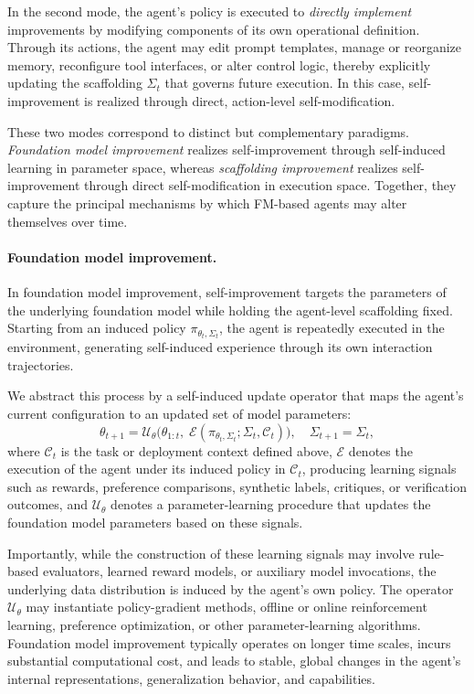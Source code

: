 In the second mode, the agent’s policy is executed to \emph{directly implement} improvements by modifying components of its own operational definition. Through its actions, the agent may edit prompt templates, manage or reorganize memory, reconfigure tool interfaces, or alter control logic, thereby explicitly updating the scaffolding $\Sigma_t$ that governs future execution. In this case, self-improvement is realized through direct, action-level self-modification.

These two modes correspond to distinct but complementary paradigms. \emph{Foundation model improvement} realizes self-improvement through self-induced learning in parameter space, whereas \emph{scaffolding improvement} realizes self-improvement through direct self-modification in execution space. Together, they capture the principal mechanisms by which FM-based agents may alter themselves over time.

\paragraph{Foundation model improvement.}
In foundation model improvement, self-improvement targets the parameters of the underlying foundation model while holding the agent-level scaffolding fixed. Starting from an induced policy $\pi_{\theta_t, \Sigma_t}$, the agent is repeatedly executed in the environment, generating self-induced experience through its own interaction trajectories.

We abstract this process by a self-induced update operator that maps the agent’s current configuration to an updated set of model parameters:
\begin{equation}
\theta_{t+1} = \mathcal{U}_\theta\bigl(\theta_{1:t},\; \mathcal{E}(\pi_{\theta_t, \Sigma_t};\Sigma_t,\mathcal{C}_t)\bigr), \quad \Sigma_{t+1} = \Sigma_t,
\end{equation}
where $\mathcal{C}_t$ is the task or deployment context defined above, $\mathcal{E}$ denotes the execution of the agent under its induced policy in $\mathcal{C}_t$, producing learning signals such as rewards, preference comparisons, synthetic labels, critiques, or verification outcomes, and $\mathcal{U}_\theta$ denotes a parameter-learning procedure that updates the foundation model parameters based on these signals.

Importantly, while the construction of these learning signals may involve rule-based evaluators, learned reward models, or auxiliary model invocations, the underlying data distribution is induced by the agent’s own policy. The operator $\mathcal{U}_\theta$ may instantiate policy-gradient methods, offline or online reinforcement learning, preference optimization, or other parameter-learning algorithms. Foundation model improvement typically operates on longer time scales, incurs substantial computational cost, and leads to stable, global changes in the agent’s internal representations, generalization behavior, and capabilities.

